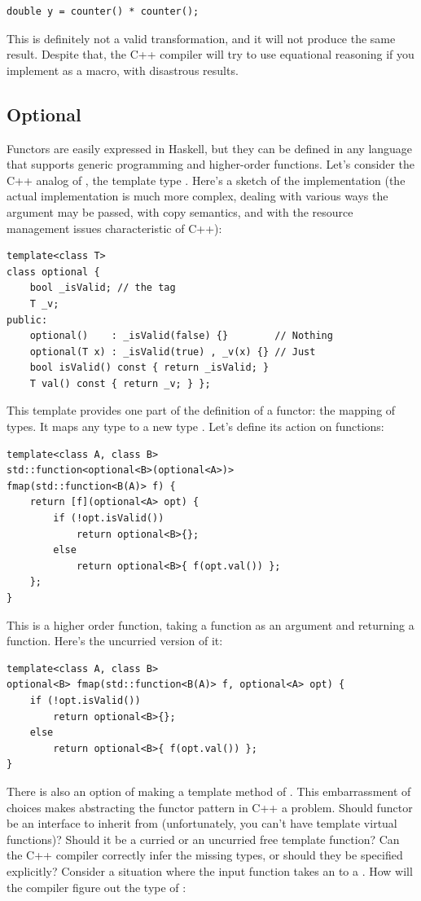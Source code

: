 \begin{verbatim}
double y = counter() * counter();
\end{verbatim}
This is definitely not a valid transformation, and it will not produce
the same result. Despite that, the C++ compiler will try to use
equational reasoning if you implement  as a macro, with
disastrous results.

\subsection{Optional}\label{optional}

Functors are easily expressed in Haskell, but they can be defined in any
language that supports generic programming and higher-order functions.
Let's consider the C++ analog of , the template type
. Here's a sketch of the implementation (the actual
implementation is much more complex, dealing with various ways the
argument may be passed, with copy semantics, and with the resource
management issues characteristic of C++):

\begin{verbatim}
template<class T>
class optional { 
    bool _isValid; // the tag
    T _v;
public:
    optional()    : _isValid(false) {}        // Nothing
    optional(T x) : _isValid(true) , _v(x) {} // Just
    bool isValid() const { return _isValid; }
    T val() const { return _v; } };
\end{verbatim}
This template provides one part of the definition of a functor: the
mapping of types. It maps any type  to a new type
. Let's define its action on
functions:

\begin{verbatim}
template<class A, class B>
std::function<optional<B>(optional<A>)>
fmap(std::function<B(A)> f) { 
    return [f](optional<A> opt) { 
        if (!opt.isValid()) 
            return optional<B>{};
        else 
            return optional<B>{ f(opt.val()) };
    };
}
\end{verbatim}
This is a higher order function, taking a function as an argument and
returning a function. Here's the uncurried version of it:

\begin{verbatim}
template<class A, class B>
optional<B> fmap(std::function<B(A)> f, optional<A> opt) { 
    if (!opt.isValid())
        return optional<B>{};
    else 
        return optional<B>{ f(opt.val()) };
}
\end{verbatim}
There is also an option of making  a template method of
. This embarrassment of choices makes abstracting the
functor pattern in C++ a problem. Should functor be an interface to
inherit from (unfortunately, you can't have template virtual functions)?
Should it be a curried or an uncurried free template function? Can the
C++ compiler correctly infer the missing types, or should they be
specified explicitly? Consider a situation where the input function
 takes an  to a . How will the
compiler figure out the type of :

